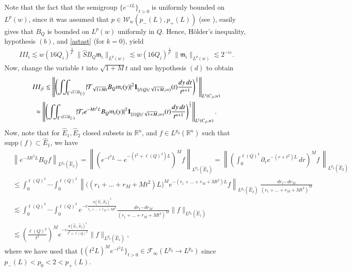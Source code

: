 \documentclass[11pt, a4paper,leqno]{amsart}
\newcommand{\mm}{\mathfrak{m}}
\renewcommand{\chi}{{\bf 1}}
\theoremstyle{plain}
\theoremstyle{definition}
\theoremstyle{remark}
\numberwithin{equation}{section}
\def \iint{\int\!\!\!\int}
\begin{document}
Note that the fact that the semigroup $\{e^{-tL}\}_{t>0}$ is uniformly bounded on $L^p(w)$, since it was assumed that $p\in \mathcal{W}_w(p_-(L),p_+(L))$ (see \cite[Proposition 5.8]{AuscherMartell:II}), easily gives that $B_Q$ is bounded on $L^p(w)$ uniformly in $Q$. Hence, H\"older's inequality,
hypothesis $(b)$, and \eqref{astast} (for $k=0$), yield 
\begin{align}\label{IIIi-1}
III_{i}\lesssim w(16Q_i)^{\frac1{p'}}\,\|\widehat{S} B_Q \mm_i\|_{L^p(w)}
\lesssim w(16Q_i)^{\frac1{p'}}\, \|\mm_i\|_{L^p(w)}
\lesssim 2^{-i\varepsilon}.
\end{align}
Now, change the variable $t$ into $\sqrt{1+M}t$ and use hypothesis $(d)$ to obtain
\begin{multline*}
III_{ji}
\lesssim \left\|
\left(\iint_{\Gamma^{\sqrt{1+M}}(\cdot)}
|\mathcal{T}_{\sqrt{1+M}t}B_Q\mm_i(y)|^2\chi_{[\ell(Q)/\sqrt{1+M},\infty)}(t)\frac{dy\,dt}{t^{n+1}}
\right)^{\frac{1}{2}}\right\|_{L^1(C_{ji},w)}
\\
\approx
\left\|
\left(\iint_{\Gamma^{\sqrt{1+M}}(\cdot)}
|\mathcal{T}_{t}e^{-Mt^2L}B_Q\mm_i(y)|^2\chi_{[\ell(Q)/\sqrt{1+M},\infty)}(t)\frac{dy\,dt}{t^{n+1}}
\right)^{\frac{1}{2}}\right\|_{L^1(C_{ji},w)}.
\end{multline*}
Now, note that for  $\widehat{E}_1, \widehat{E}_2$ closed subsets in $\mathbb{R}^n$, and $f\in L^{p_0}(\mathbb{R}^n)$ such that $\textrm{supp}(f)\subset \widehat{E}_1$,  we have
\begin{align}\label{AB}
&\left\|e^{-Mt^2L}B_Qf\right\|_{L^{p_0}(\widehat{E}_2)}
=
\left\|(e^{-t^2L}-e^{-(t^2+\ell(Q)^2)L})^M f\right\|_{L^{p_0}(\widehat{E}_2)}
=
\left\|\left(\int_{0}^{\ell(Q)^2}\partial_r e^{-(r+t^2)L}\,dr\right)^M f\,  \right\|_{L^{p_0}(\widehat{E}_2)}
\\ \nonumber
&\leq
\int_{0}^{\ell(Q)^2}\!\!\!\cdots \int_{0}^{\ell(Q)^2}\left\|
\big((r_1+\dots+r_M+M t^2) L \big)^M e^{-(r_1+\dots+r_M+M t^2) L}f\right\|_{L^{p_0}(\widehat{E}_2)} \ \frac{dr_1 \cdots dr_M}{(r_1+\dots+r_M+M t^2)^M}
\\ \nonumber
&\lesssim
\int_{0}^{\ell(Q)^2}\!\!\!\cdots \int_{0}^{\ell(Q)^2}
e^{-c\frac{d(\widehat{E}_1,\widehat{E}_2)^2}{r_1+\dots+r_M+M t^2}}\frac{dr_1 \cdots dr_M}{(r_1+\dots+r_M+M t^2)^M}\|f\|_{L^{p_0}(\widehat{E}_1)}
\\ \nonumber
&
\lesssim
\left(\frac{\ell(Q)^2}{t^2}\right)^M
e^{-c\frac{d(\widehat{E}_1,\widehat{E}_2)^2}{t^2+\ell(Q)^2}}\|f\|_{L^{p_0}(\widehat{E}_1)},
\end{align}
where we have used that  $\{(t^2 L)^M e^{-t^2L}\}_{t>0}\in \mathcal{F}_{\infty}(L^{p_0}\rightarrow L^{p_0})$ since $p_-(L)<p_0<2<p_+(L)$.
\end{document}
